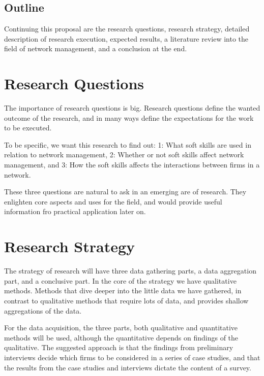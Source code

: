 \documentclass[12pt,journal,compsoc]{IEEEtran}
\begin{document}
\subsection{Outline}
Continuing this proposal are the research questions, research strategy,
detailed description of research execution, expected results, a literature
review into the field of network management, and a conclusion at the end.  

\section{Research Questions}
The importance of research questions is big. Research questions define the
wanted outcome of the research, and in many ways define the expectations for
the work to be executed. 

To be specific, we want this research to find out: 
1: What soft skills are used in relation to network management, 2: Whether or not soft
skills affect network management, and 3: How the soft skills
affects the interactions between firms in a network.

These three questions are natural to ask in an emerging are of research. They
enlighten core aspects and uses for the field, and would provide useful
information fro practical application later on.  

\section{Research Strategy}

The strategy of research will have three data gathering parts, a data
aggregation part, and a conclusive part. In the core of the strategy we have
qualitative methods. Methods that dive deeper into the little data we have
gathered, in contrast to qualitative methods that require lots of data, and
provides shallow aggregations of the data. 


For the data acquisition, the three parts, both qualitative and quantitative
methods will be used, although the quantitative depends on findings of the
qualitative. The suggested approach is that the findings from preliminary
interviews decide which firms to be considered in a series of case studies, and
that the results from the case studies and interviews dictate the content of a
survey. 
\end{document}
